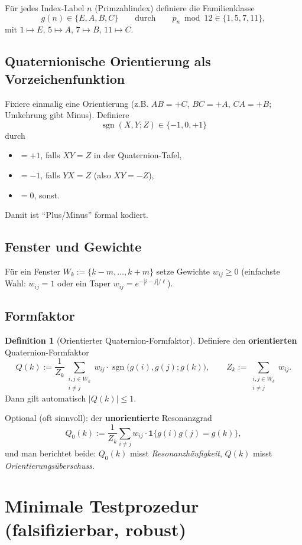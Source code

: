 \documentclass[11pt,a4paper]{article}
\theoremstyle{definition}
\newtheorem{definition}{Definition}[section]
\begin{document}
Für jedes Index-Label $n$ (Primzahlindex) definiere die Familienklasse
\[
g(n)\in\{E,A,B,C\}
\qquad\text{durch}\qquad
p_n\bmod 12\in\{1,5,7,11\},
\]
mit $1\mapsto E$, $5\mapsto A$, $7\mapsto B$, $11\mapsto C$.

\subsection{Quaternionische Orientierung als Vorzeichenfunktion}

Fixiere einmalig eine Orientierung (z.B. $AB=+C$, $BC=+A$, $CA=+B$; Umkehrung gibt Minus). Definiere
\[
\operatorname{sgn}(X,Y;Z)\in\{-1,0,+1\}
\]
durch
\begin{itemize}
\item $=+1$, falls $XY=Z$ in der Quaternion-Tafel,
\item $=-1$, falls $YX=Z$ (also $XY=-Z$),
\item $=0$, sonst.
\end{itemize}
Damit ist ``Plus/Minus'' formal kodiert.

\subsection{Fenster und Gewichte}

Für ein Fenster $W_k:=\{k-m,\dots,k+m\}$ setze Gewichte $w_{ij}\ge 0$ (einfachste Wahl: $w_{ij}=1$ oder ein Taper $w_{ij}=e^{-|i-j|/\ell}$).

\subsection{Formfaktor}

\begin{definition}[Orientierter Quaternion-Formfaktor]
Definiere den \textbf{orientierten} Quaternion-Formfaktor
\[
\boxed{
Q(k)
:=
\frac{1}{Z_k}
\sum_{\substack{i,j\in W_k\\ i\neq j}}
w_{ij} \cdot \operatorname{sgn}\big(g(i),g(j);g(k)\big),
}
\qquad
Z_k:=\sum_{\substack{i,j\in W_k\\ i\neq j}} w_{ij}.
\]
Dann gilt automatisch $|Q(k)|\le 1$.
\end{definition}

Optional (oft sinnvoll): der \textbf{unorientierte} Resonanzgrad
\[
Q_0(k):=\frac{1}{Z_k}\sum_{i\neq j} w_{ij} \cdot \mathbf{1}\{g(i)g(j)=g(k)\},
\]
und man berichtet beide: $Q_0(k)$ misst \emph{Resonanzhäufigkeit}, $Q(k)$ misst \emph{Orientierungsüberschuss}.

\section{Minimale Testprozedur (falsifizierbar, robust)}
\end{document}
